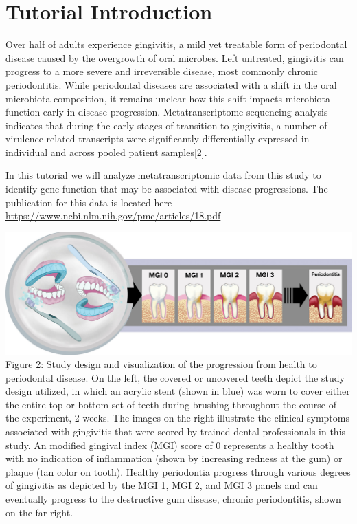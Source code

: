 \documentclass[
]{book}
\begin{document}
\hypertarget{tutorial-introduction}{%
\section{Tutorial Introduction}\label{tutorial-introduction}}

Over half of adults experience gingivitis, a mild yet treatable form of periodontal disease caused by the overgrowth
of oral microbes. Left untreated, gingivitis can progress to a more severe and irreversible disease, most
commonly chronic periodontitis. While periodontal diseases are associated with a shift in the oral microbiota
composition, it remains unclear how this shift impacts microbiota function early in disease progression. Metatranscriptome
sequencing analysis indicates that during the early stages of transition to gingivitis, a number of
virulence-related transcripts were significantly differentially expressed in individual and across pooled patient
samples{[}2{]}.

In this tutorial we will analyze metatranscriptomic data from this study to identify gene function that may be associated
with disease progressions. The publication for this data is located here \url{https://www.ncbi.nlm.nih.gov/pmc/articles/18.pdf}

\includegraphics[width=1\textwidth,height=\textheight]{./Figures/gingivitis.png}
Figure 2: Study design and visualization of the progression from health to periodontal disease. On the left, the covered or uncovered teeth depict the study design utilized, in which an acrylic stent (shown in blue) was worn to cover either the entire top or bottom set of teeth during brushing throughout the course of the experiment, 2 weeks. The images on the right illustrate the clinical symptoms associated with gingivitis that were scored by trained dental professionals in this study. An modified gingival index (MGI) score of 0 represents a healthy tooth with no indication of inflammation (shown by increasing redness at the gum) or plaque (tan color on tooth). Healthy periodontia progress through various degrees of gingivitis as depicted by the MGI 1, MGI 2, and MGI 3 panels and can eventually progress to the destructive gum disease, chronic periodontitis, shown on the far right.
\end{document}
